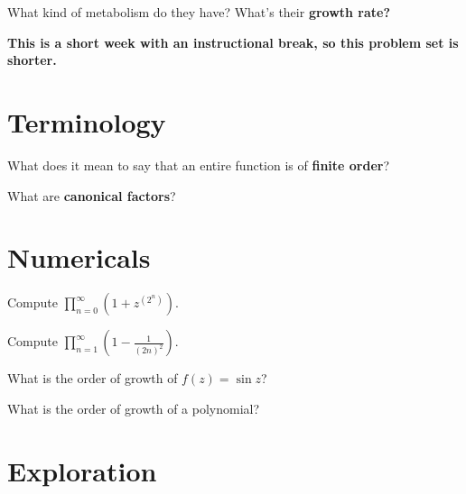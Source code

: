 \documentclass{homework}
\author{Jim Fowler}
\begin{document}
\maketitle

\begin{inspiration}
What kind of metabolism do they have? What's their \textbf{growth rate?}
\end{inspiration}

\textbf{This is a short week with an instructional break, so this
  problem set is shorter.}

\section{Terminology}

\begin{problem}
  What does it mean to say that an entire function is of
  \textbf{finite order}?
\end{problem}

\begin{problem}
  What are \textbf{canonical factors}?
\end{problem}

\section{Numericals}

\begin{problem}
  Compute $\displaystyle\prod_{n=0}^\infty \left( 1 + z^{(2^n)} \right)$.
\end{problem}

\begin{problem}
  Compute $\displaystyle\prod_{n=1}^\infty \left( 1 - \frac{1}{(2n)^2} \right)$.
\end{problem}

\begin{problem}
  What is the order of growth of $f(z) = \sin z$?
\end{problem}

\begin{problem}
  What is the order of growth of a polynomial?
\end{problem}

\section{Exploration}
\end{document}
